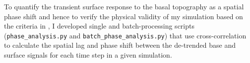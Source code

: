







To quantify the transient surface response to the basal topography as a spatial phase shift and hence to verify the physical validity of my simulation based on the criteria in \cite{Budd_1970}, I developed single and batch-processing scripts (\texttt{phase\_analysis.py} and \texttt{batch\_phase\_analysis.py}) that use cross-correlation to calculate the spatial lag and phase shift between the de-trended base and surface signals for each time step in a given simulation.

